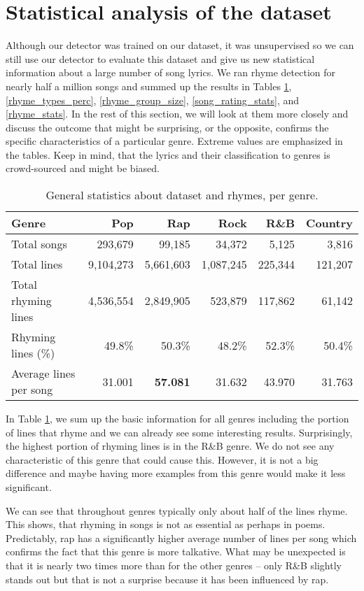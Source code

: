 \section{Statistical analysis of the dataset}
Although our detector was trained on our dataset, it was unsupervised so we can still use our detector to evaluate this dataset and give us new statistical information about a large number of song lyrics. We ran rhyme detection for nearly half a million songs and summed up the results in Tables \ref{rhyme_line_stats}, \ref{rhyme_types_perc}, \ref{rhyme_group_size}, \ref{song_rating_stats}, and \ref{rhyme_stats}. In the rest of this section, we will look at them more closely and discuss the outcome that might be surprising, or the opposite, confirms the specific  characteristics of a particular genre. Extreme values are emphasized in the tables. Keep in mind, that the lyrics and their classification to genres is crowd-sourced and might be biased.
\begin{table}[h!]
	\centering
	\begin{tabular}{l | r r r r r} 	
		Genre & 			Pop & 		Rap & 		Rock & 		R\&B & 		Country\\ 
		\midrule
		 Total songs& 293,679 & 99,185& 34,372& 5,125& 3,816 \\
		Total lines& 9,104,273 &5,661,603& 1,087,245& 225,344& 121,207 \\ 
		Total rhyming lines& 4,536,554& 2,849,905& 523,879& 117,862& 61,142 \\ 
		 Rhyming lines (\%) & 49.8\%& 50.3\%& 48.2\%& 52.3\%& 50.4\%  \\
		 Average lines per song & 31.001 & \textbf{57.081} & 31.632 & 43.970 & 31.763  \\

	\end{tabular}
	\caption{General statistics about dataset and rhymes, per genre.} 
	\label{rhyme_line_stats}
\end{table}

In Table \ref{rhyme_line_stats}, we sum up the basic information for all genres including the portion of lines that rhyme and we can already see some interesting results. Surprisingly, the highest portion of rhyming lines is in the R\&B genre. We do not see any characteristic of this genre that could cause this. However, it is not a big difference and maybe having more examples from this genre would make it less significant. 

We can see that throughout genres typically only about half of the lines rhyme. This shows, that rhyming in songs is not as essential as perhaps in poems. Predictably, rap has a significantly higher average number of lines per song which confirms the fact that this genre is more talkative. What may be unexpected is that it is nearly two times more than for the other genres -- only R\&B slightly stands out but that is not a surprise because it has been influenced by rap.


